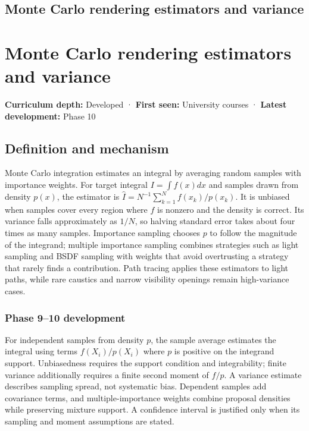 \hypertarget{appendix-031e02bf28af}{}
\section*{Monte Carlo rendering estimators and variance}
\chapter{Monte Carlo rendering estimators and variance}\label{appendix-031e02bf28af-monte-carlo-rendering-estimators-and-variance}

\textbf{Curriculum depth:} Developed · \textbf{First seen:} University courses · \textbf{Latest development:} Phase 10

\section{Definition and mechanism}\label{appendix-031e02bf28af-definition-and-mechanism}

Monte Carlo integration estimates an integral by averaging random samples with importance weights. For target integral \(I=\int f(x)dx\) and samples drawn from density \(p(x)\), the estimator is \(\hat I=N^{-1}\sum_{k=1}^N f(x_k)/p(x_k)\). It is unbiased when samples cover every region where \(f\) is nonzero and the density is correct. Its variance falls approximately as \(1/N\), so halving standard error takes about four times as many samples. Importance sampling chooses \(p\) to follow the magnitude of the integrand; multiple importance sampling combines strategies such as light sampling and BSDF sampling with weights that avoid overtrusting a strategy that rarely finds a contribution. Path tracing applies these estimators to light paths, while rare caustics and narrow visibility openings remain high-variance cases.

\subsection{Phase 9--10 development}\label{appendix-031e02bf28af-phase-910-development}

For independent samples from density \(p\), the sample average estimates the integral using terms \(f(X_i)/p(X_i)\) where \(p\) is positive on the integrand support. Unbiasedness requires the support condition and integrability; finite variance additionally requires a finite second moment of \(f/p\). A variance estimate describes sampling spread, not systematic bias. Dependent samples add covariance terms, and multiple-importance weights combine proposal densities while preserving mixture support. A confidence interval is justified only when its sampling and moment assumptions are stated.

